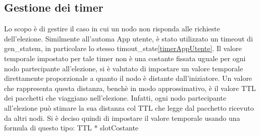 \subsection{Gestione dei timer}
Lo scopo è di gestire il caso in cui un nodo non risponda alle richieste dell'elezione. Similmente all'automa App utente, è stato utilizzato un timeout di gen\_statem, in particolare lo stesso timout\_state\ref{timerAppUtente}. 
Il valore temporale impostato per tale timer non è una costante fissata uguale per ogni nodo partecipante all'elezione, si è valutato di impostare un valore temporale direttamente proporzionale a quanto il nodo è distante dall'iniziatore.
Un valore che rappresenta questa distanza, benchè in modo approssimativo, è il valore TTL dei pacchetti che viaggiano nell'elezione. Infatti, ogni nodo partecipante all'elezione può stimare la sua distanza col TTL che legge dal pacchetto ricevuto da altri nodi. 
Si è deciso quindi di impostare il valore temporale usando una formula di questo tipo:
TTL * slotCostante

